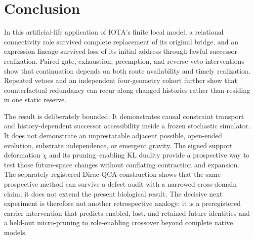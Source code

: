 \section{Conclusion}
\label{sec:conclusion}

In this artificial-life application of IOTA's finite local model, a relational
connectivity role survived complete replacement of its original bridge, and an
expression lineage survived loss of its initial address through lawful
successor realization. Paired gate,
exhaustion, preemption, and reverse-veto interventions show that continuation
depends on both route availability and timely realization. Repeated vetoes and
an independent four-geometry cohort further show that counterfactual redundancy
can recur along changed histories rather than residing in one static reserve.

The result is deliberately bounded. It demonstrates causal constraint transport
and history-dependent successor accessibility inside a frozen stochastic
simulator. It does not demonstrate an unprestatable adjacent possible,
open-ended evolution, substrate independence, or emergent gravity. The signed
support deformation $\chi$ and its pruning--enabling KL duality provide a
prospective way to test those future-space changes without conflating
contraction and expansion. The separately registered Dirac-QCA construction
shows that the same prospective method can survive a defect audit with a
narrowed cross-domain claim; it does not extend the present biological result.
The decisive next experiment is therefore not
another retrospective analogy: it is a preregistered carrier intervention that
predicts enabled, lost, and retained future identities and a held-out
micro-pruning to role-enabling crossover beyond complete native models.
